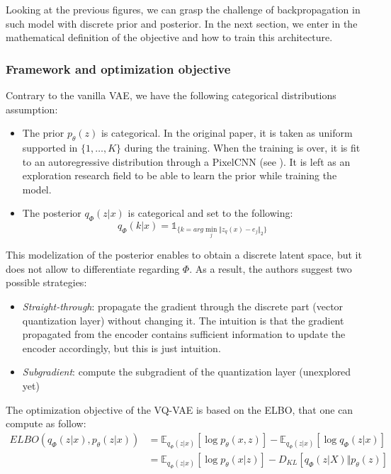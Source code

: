 Looking at the previous figures, we can grasp the challenge of backpropagation in such model with discrete prior and posterior.
In the next section, we enter in the mathematical definition of the objective and how to train this architecture.

\subsubsection{Framework and optimization objective}

Contrary to the vanilla VAE, we have the following categorical distributions assumption:
\begin{itemize}
    \item The prior $p_{\theta}(z)$ is categorical.
          In the original paper, it is taken as uniform supported in $\{1, \dots, K\}$ during the training.
          When the training is over, it is fit to an autoregressive distribution through a PixelCNN (see \cite{pixel_cnn_paper}).
          It is left as an exploration research field to be able to learn the prior while training the model.
    \item The posterior $q_{\Phi}(z|x)$ is categorical and set to the following:
          $$
          q_{\Phi}(k|x) = \mathds{1}_{\{k = arg\min_{j} \Vert z_q(x) - e_j \Vert_2\}}
          $$
\end{itemize}

This modelization of the posterior enables to obtain a discrete latent space, but it does not allow to differentiate regarding $\Phi$.
As a result, the authors suggest two possible strategies:
\begin{itemize}
    \item \textit{Straight-through}: propagate the gradient through the discrete part (vector quantization layer) without changing it.
          The intuition is that the gradient propagated from the encoder contains sufficient information to update the encoder accordingly, but this is just intuition.
    \item \textit{Subgradient}: compute the subgradient of the quantization layer (unexplored yet)
\end{itemize}

The optimization objective of the VQ-VAE is based on the ELBO, that one can compute as follow:
$$
\begin{align}
    ELBO(q_{\Phi}(z|x), p_{\theta}(z|x)) &= \mathbb{E}_{q_{\Phi}(z|x)}[\log p_{\theta}(x,z)] - \mathbb{E}_{q_{\Phi}(z|x)}[\log q_{\Phi}(z|x)] \\
    &= \mathbb{E}_{q_{\Phi}(z|x)}[\log p_{\theta}(x|z)] - D_{KL}[q_{\Phi}(z|X) \Vert p_{\theta}(z)]
\end{align}
$$

